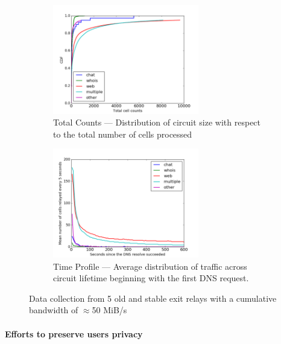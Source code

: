 \begin{figure}[t] \centering
  \begin{subfigure}[t]{0.47\textwidth} \centering\centering
    \includegraphics[width=0.7\textwidth]{images/totcellcountscdf.pdf}
    \caption{Total Counts --- Distribution of circuit size with respect to the total number of cells processed}
    \label{fig:statsb}
  \end{subfigure}
  \begin{subfigure}[t]{0.47\textwidth} \centering
    \includegraphics[width=0.7\textwidth]{images/exitmeasurement.pdf}
    \caption{Time Profile --- Average distribution of traffic across circuit lifetime beginning with the first DNS request.}
    \label{fig:statsa}
  \end{subfigure}
  \caption{Data collection from 5 old and stable exit relays with a cumulative bandwidth of $\approx$50 MiB/s}
  \label{fig:stats}
\end{figure}

\paragraph*{Efforts to preserve users privacy}

